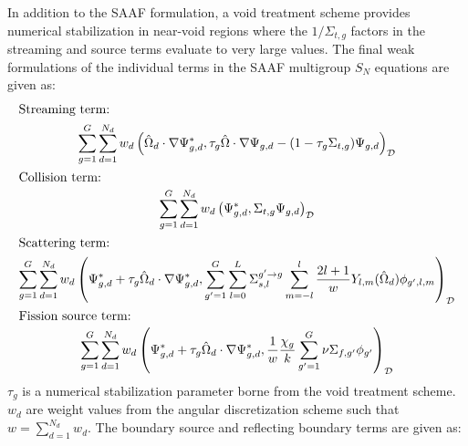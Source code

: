 \documentclass[letterpaper]{mc2025}
\begin{document}
In addition to the \gls*{SAAF} formulation, a void treatment scheme \cite{wang_diffusion_2014}
provides numerical stabilization in near-void regions where the $1/\Sigma_{t,g}$ factors in the
streaming and source terms evaluate to very large values. The final weak formulations of the
individual terms in the \gls*{SAAF} multigroup $S_N$ equations are given as:
%
\begin{gather}
  \shortintertext{Streaming term:}
  \sum^G_{g=1}\sum^{N_d}_{d=1}w_d\left(\hat{\Omega}_d\cdot\nabla\Psi^*_{g,d},\tau_g\hat{\Omega}
  \cdot\nabla\Psi_{g,d}-(1-\tau_g\Sigma_{t,g})\Psi_{g,d}\right)_\mathcal{D} \\
  \shortintertext{Collision term: }
  \sum^G_{g=1}\sum^{N_d}_{d=1}w_d\left(\Psi^*_{g,d},\Sigma_{t,g}\Psi_{g,d}\right)_\mathcal{D} \\
  \shortintertext{Scattering term:}
  \sum^G_{g=1}\sum^{N_d}_{d=1}w_d\left(\Psi^*_{g,d}+\tau_g\hat{\Omega}_d\cdot\nabla\Psi^*_{g,d},
  \sum^G_{g'=1}\sum^L_{l=0}\Sigma^{g'\rightarrow g}_{s,l}\sum^l_{m=-l}
  \frac{2l+1}{w}Y_{l,m}(\hat{\Omega}_d)\phi_{g',l,m}\right)_\mathcal{D} \\
  \shortintertext{Fission source term: }
  \sum^G_{g=1}\sum^{N_d}_{d=1}w_d\left(\Psi^*_{g,d}+\tau_g\hat{\Omega}_d\cdot\nabla\Psi^*_{g,d},
  \frac{1}{w}\frac{\chi_g}{k}\sum^G_{g'=1}\nu\Sigma_{f,g'}\phi_{g'}\right)_\mathcal{D}
\end{gather}
%
$\tau_g$ is a numerical stabilization parameter borne from the void treatment scheme. $w_d$ are
weight values from the angular discretization scheme such that $w=\sum^{N_d}_{d=1} w_d$.
The boundary source and reflecting boundary terms are given as:
%
\end{document}

